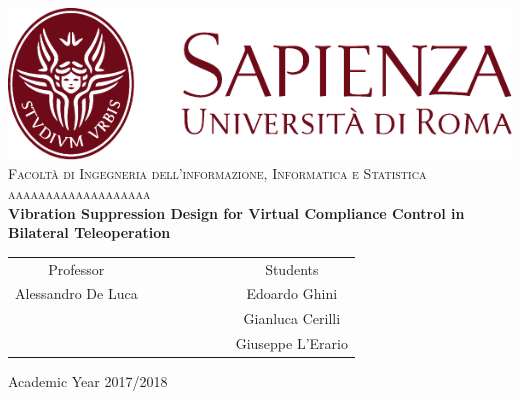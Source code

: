 \begin{titlepage}
\begin{center}
	\includegraphics[scale=0.8]{Images/SapienzaLogo} \\
	\vspace{3em}
	{\large \textsc{Facoltà di  Ingegneria dell'informazione, Informatica e Statistica}} \\
	\vspace{2em}
	{\large \textsc{ aaaaaaaaaaaaaaaaaaa}} \\
	\doublespacing
	\vspace{5em}
	{\Large \textbf{Vibration Suppression Design for Virtual Compliance Control
			in Bilateral Teleoperation}}
\end{center}

\vskip 2cm
\begin{center}
\begin{tabular}{c c c c c c c c}
	Professor & & & & & & & Students \\[0.2cm]
	\large{Alessandro De Luca} & & & & & & & \large{Edoardo Ghini}\\[0.4cm]
	\large{} & & & & & & & \large{Gianluca Cerilli}\\[0.4cm]
	\large{} & & & & & & & \large{Giuseppe L'Erario}\\[0.4cm]
\end{tabular}
\end{center}

\vskip 1.5cm
\begin{center}
	{\normalsize Academic Year 2017/2018}
\end{center}
\end{titlepage}

\clearpage{\pagestyle{empty}\cleardoublepage}

\vspace{5em}

\onehalfspacing

\clearpage{\pagestyle{empty}\cleardoublepage}
